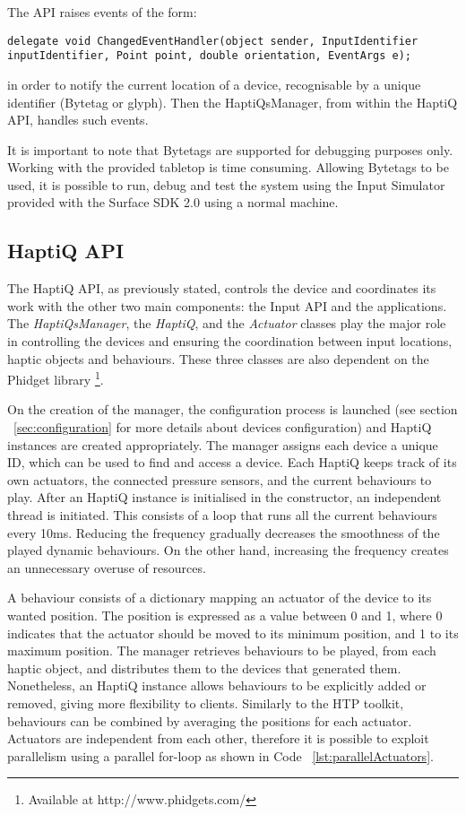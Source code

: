 The API raises events of the form:
\lstset{style=sharpc1}
\begin{lstlisting}
delegate void ChangedEventHandler(object sender, InputIdentifier inputIdentifier, Point point, double orientation, EventArgs e);
\end{lstlisting}

in order to notify the current location of a device, recognisable by a unique identifier (Bytetag or glyph). Then the HaptiQsManager, from within the HaptiQ API, handles such events.  

It is important to note that Bytetags are supported for debugging purposes only. Working with the provided tabletop is time consuming. Allowing Bytetags to be used, it is possible to run, debug and test the system using the Input Simulator provided with the Surface SDK 2.0 using a normal machine. 

\subsection{HaptiQ API}

The HaptiQ API, as previously stated, controls the device and coordinates its work with the other two main components: the Input API and the applications. The \textit{HaptiQsManager}, the \textit{HaptiQ}, and the \textit{Actuator} classes play the major role in controlling the devices and ensuring the coordination between input locations, haptic objects and behaviours. These three classes are also dependent on the Phidget library \footnote{Available at http://www.phidgets.com/}. 

On the creation of the manager, the configuration process is launched (see section ~\ref{sec:configuration} for more details about devices configuration) and HaptiQ instances are created appropriately. The manager assigns each device a unique ID, which can be used to find and access a device. 
Each HaptiQ keeps track of its own actuators, the connected pressure sensors, and the current behaviours to play. After an HaptiQ instance is initialised in the constructor, an independent thread is initiated. This consists of a loop that runs all the current behaviours every 10ms. Reducing the frequency gradually decreases the smoothness of the played dynamic behaviours. On the other hand, increasing the frequency creates an unnecessary overuse of resources. 

A behaviour consists of a dictionary mapping an actuator of the device to its wanted position. The position is expressed as a value between 0 and 1, where 0 indicates that the actuator should be moved to its minimum position, and 1 to its maximum position. The manager retrieves behaviours to be played, from each haptic object, and distributes them to the devices that generated them. Nonetheless, an HaptiQ instance allows behaviours to be explicitly added or removed, giving more flexibility to clients. Similarly to the HTP toolkit, behaviours can be combined by averaging the positions for each actuator. 
Actuators are independent from each other, therefore it is possible to exploit parallelism using a parallel for-loop as shown in Code ~\ref{lst:parallelActuators}.

